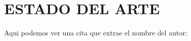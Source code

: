 \chapter{ESTADO DEL ARTE}

\lipsum[1-2]

Aqui podemos ver una cita que extrae el nombre del autor: \citeauthor{latex:companion}

